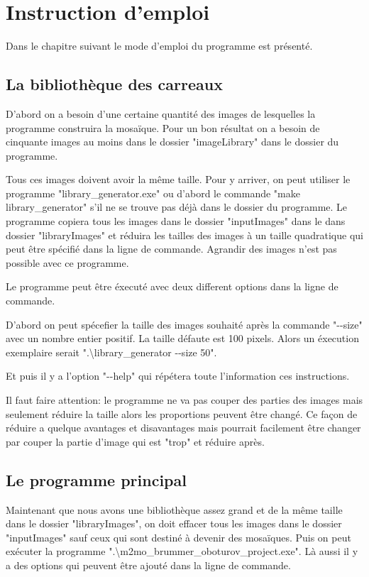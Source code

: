 \documentclass[a4paper]{article}
\begin{document}
\section{Instruction d'emploi}
Dans le chapitre suivant le mode d'emploi du programme est pr\'esent\'e.
\subsection{La biblioth\`eque des carreaux}
D'abord on a besoin d'une certaine quantit\'e des images de lesquelles la programme construira la mosa\"{i}que.
 Pour un bon r\'esultat on a besoin de cinquante images au moins dans le dossier "imageLibrary" dans le dossier du programme.

Tous ces images doivent avoir la m\^eme taille.
Pour y arriver, on peut utiliser le programme "library\_generator.exe" ou d'abord le commande "make library\_generator" s'il ne se trouve pas d\'ej\`a dans le dossier du programme.
 Le programme copiera tous les images dans le dossier "inputImages" dans le dans dossier "libraryImages" et r\'eduira les tailles des images \`a un taille quadratique qui peut \^etre sp\'ecifi\'e dans la ligne de commande.
 Agrandir des images n'est pas possible avec ce programme.
 
 Le programme peut \^etre \'execut\'e avec deux different options dans la ligne de commande.
 
 D'abord on peut sp\'ecefier la taille des images souhait\'e apr\`es la commande "{-}{-}size" avec un nombre entier positif.
 La taille d\'efaute est 100 pixels.
Alors un \'execution exemplaire serait ".\textbackslash library\_generator {-}{-}size 50".

Et puis il y a l'option "{-}{-}help" qui r\'ep\'etera toute l'information ces instructions.

Il faut faire attention: le programme ne va pas couper des parties des images mais seulement r\'eduire la taille alors les proportions peuvent \^etre chang\'e.
Ce fa\c{c}on de r\'eduire a quelque avantages et disavantages mais pourrait facilement \^etre changer par couper la partie d'image qui est "trop" et r\'eduire apr\`es.

\subsection{Le programme principal}
Maintenant que nous avons une biblioth\`eque assez grand et de la m\^eme taille dans le dossier "libraryImages", on doit effacer tous les images dans le dossier "inputImages" sauf ceux qui sont destin\'e \`a devenir des mosa\"iques.
Puis on peut ex\'ecuter la programme ".\textbackslash m2mo\_brummer\_oboturov\_project.exe".
L\`a aussi il y a des options qui peuvent \^etre ajout\'e dans la ligne de commande.
\end{document}
